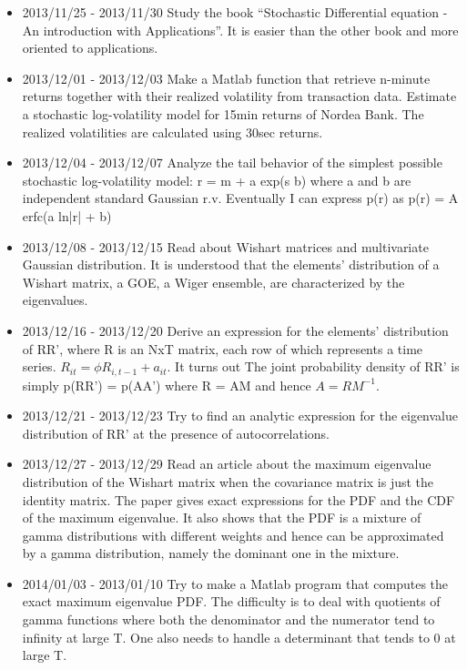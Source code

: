 \documentclass{article}
\begin{document}
\begin{itemize}
\item 2013/11/25 - 2013/11/30
Study the book ``Stochastic Differential equation - An introduction
with Applications''. It is easier than the other book and more
oriented to applications.

\item 2013/12/01 - 2013/12/03
Make a Matlab function that retrieve n-minute returns together with
their realized volatility from transaction data.
Estimate a stochastic log-volatility model for 15min returns of
Nordea Bank. The realized volatilities are calculated using 30sec
returns.

\item 2013/12/04 - 2013/12/07
Analyze the tail behavior of the simplest possible stochastic
log-volatility model: r = m + a exp(s b) where a and b are independent
standard Gaussian r.v. Eventually I can express p(r) as
p(r) = A erfc(a ln|r| + b)

\item 2013/12/08 - 2013/12/15
Read about Wishart matrices and multivariate Gaussian distribution.
It is understood that the elements' distribution of a Wishart
matrix, a GOE, a Wiger ensemble, are characterized by the
eigenvalues.

\item 2013/12/16 - 2013/12/20
Derive an expression for the elements' distribution of RR', where
R is an NxT matrix, each row of which represents a time series.
$R_{it} = \phi R_{i, t-1} + a_{it}$. It turns out The joint
probability density of RR' is simply p(RR') = p(AA') where R = AM and
hence $A = RM^{-1}$.

\item 2013/12/21 - 2013/12/23
Try to find an analytic expression for the eigenvalue distribution
of RR' at the presence of autocorrelations.

\item 2013/12/27 - 2013/12/29
Read an article about the maximum eigenvalue distribution of the
Wishart matrix when the covariance matrix is just the identity
matrix. The paper gives exact expressions for the PDF and the CDF of
the maximum eigenvalue. It also shows that the PDF is a mixture of
gamma distributions with different weights and hence can be
approximated by a gamma distribution, namely the dominant one in the
mixture.

\item 2014/01/03 - 2013/01/10
Try to make a Matlab program that computes the exact maximum
eigenvalue PDF. The difficulty is to deal with quotients of gamma
functions where both the denominator and the numerator tend to
infinity at large T. One also needs to handle a determinant that tends
to 0 at large T.


\end{itemize}
\end{document}
